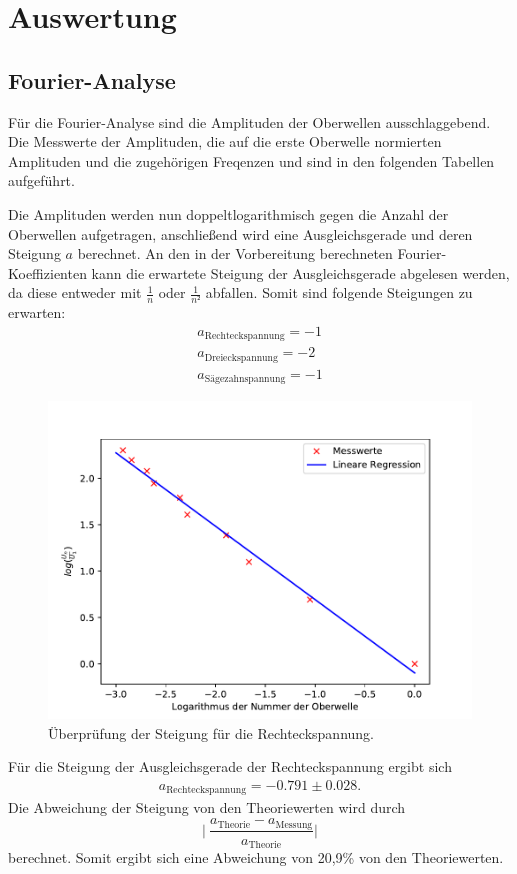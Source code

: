 \section{Auswertung}
\label{sec:Auswertung}
\subsection{Fourier-Analyse}
Für die Fourier-Analyse sind die Amplituden der Oberwellen ausschlaggebend.
Die Messwerte der Amplituden, die auf die erste Oberwelle normierten Amplituden
und die zugehörigen Freqenzen und sind in den folgenden Tabellen aufgeführt.



Die Amplituden werden nun doppeltlogarithmisch gegen die Anzahl der Oberwellen
aufgetragen, anschließend wird eine Ausgleichsgerade und deren Steigung $a$ berechnet.
An den in der Vorbereitung berechneten Fourier-Koeffizienten %
kann die erwartete Steigung der Ausgleichsgerade abgelesen werden, da diese
entweder mit $\frac{1}{n}$ oder $\frac{1}{n²}$ abfallen.
Somit sind folgende Steigungen zu erwarten: \\

\begin{align*}
  a_{\text{Rechteckspannung}} = -1 \\
  a_{\text{Dreieckspannung}} = -2  \\
  a_{\text{Sägezahnspannung}} = -1
\end{align*}

\begin{figure}[H]
  \centering
  \includegraphics{plot1.pdf}
  \caption{Überprüfung der Steigung für die Rechteckspannung.}
  \label{fig:plot1}
\end{figure}
Für die Steigung der Ausgleichsgerade der Rechteckspannung ergibt sich
\begin{align*}
 a_{\text{Rechteckspannung}}= -0.791 \pm 0.028.
\end{align*}
Die Abweichung der Steigung von den Theoriewerten wird durch
\begin{equation}
  \lvert \: \frac{a_{\text{Theorie}}-a_{\text{Messung}}}{a_{\text{Theorie}}} \rvert
  \label{eqn:abw}
\end{equation}
berechnet.
Somit ergibt sich eine Abweichung von 20,9\% von den Theoriewerten.

